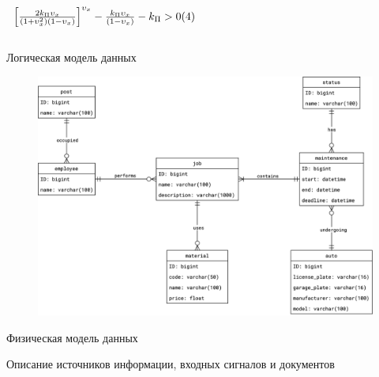 \documentclass{beamer}
\begin{document}
\begin{frame}
\begin{columns}[c]
\begin{column}{0.56\linewidth}
{\begin{math}
\begin{array}{l}
        \left[
            \frac%
                { 2 k_\Pi \upsilon_x }%
                { \left( 1 + \upsilon^2_x \right) \left( 1 - \upsilon_x \right) }
        \right]^{ \upsilon_x }
        -
        \frac%
            { k_\Pi \upsilon_x }%
            { \left( 1 - \upsilon_x \right) }
        -
        k_\Pi > 0 \hfill (4)
    \end{array}
\end{math}
}
        \end{column}
    \end{columns}
\end{frame}

\begin{frame}
	{Логическая модель данных}
    \begin{figure}[H]
        \centering
        \includegraphics[keepaspectratio,width=\textwidth]{3/images/3_1_db_logical.png}
    \end{figure}
\end{frame}

\begin{frame}
	{Физическая модель данных}
\end{frame}

\begin{frame}
	{Описание источников информации, входных сигналов и документов}
\end{frame}
\end{document}
